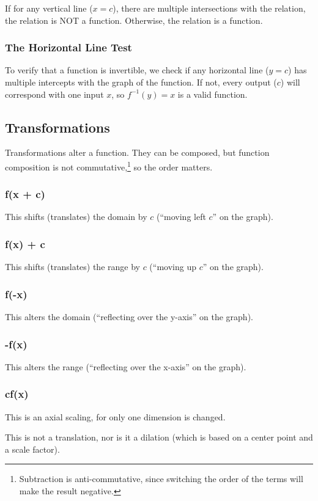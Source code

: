 \documentclass{article}
\begin{document}
If for any vertical line ($x=c$), there are multiple intersections with the relation, the relation is NOT a function. Otherwise, the relation is a function.

\subsubsection{The Horizontal Line Test}\label{horizontal-line}
To verify that a function is invertible, we check if any horizontal line ($y=c$) has multiple intercepts with the graph of the function. If not, every output ($c$) will correspond with one input $x$, so $f^{-1}(y)=x$ is a valid function.

\subsection{Transformations}
Transformations alter a function. They can be composed, but function composition is not commutative,\footnote{Subtraction is anti-commutative, since switching the order of the terms will make the result negative.} so the order matters.


\subsubsection{f(x + c)}
This shifts (translates) the domain by $c$ (``moving left $c$'' on the graph).
\subsubsection{f(x) + c}
This shifts (translates) the range by $c$ (``moving up $c$'' on the graph).
\subsubsection{f(-x)}
This alters the domain (``reflecting over the y-axis'' on the graph).
\subsubsection{-f(x)}
This alters the range (``reflecting over the x-axis'' on the graph).
\subsubsection{cf(x)}
This is an axial scaling, for only one dimension is changed.

This is not a translation, nor is it a dilation (which is based on a center point and a scale factor).
\end{document}
